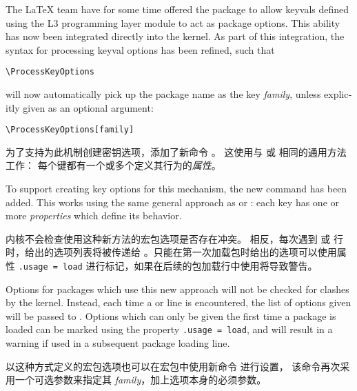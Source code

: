 \documentclass{ltnews}
\begin{document}
\begin{english}
The \LaTeX{} team have for some time offered the package  to
allow keyvals defined using the L3 programming layer module  to act
as package options. This ability has now been integrated directly into the
kernel. As part of this integration, the syntax for processing keyval options
has been refined, such that
\begin{verbatim}
\ProcessKeyOptions
\end{verbatim}
will now automatically pick up the package name as the key \emph{family},
unless explicitly given as an optional argument:
\begin{verbatim}
\ProcessKeyOptions[family]
\end{verbatim}
\end{english}

为了支持为此机制创建密钥选项，添加了新命令 。
这使用与  或  相同的通用方法工作：
每个键都有一个或多个定义其行为的\emph{属性}。

\begin{english}
To support creating key options for this mechanism, the new command
 has been added. This works using the same general
approach as  or : each key has one or more
\emph{properties} which define its behavior.
\end{english}

内核不会检查使用这种新方法的宏包选项是否存在冲突。
相反，每次遇到  或  行时，给出的选项列表将被传递给
。只能在第一次加载包时给出的选项可以使用属性 \texttt{.usage = load}
进行标记，如果在后续的包加载行中使用将导致警告。

\begin{english}
Options for packages which use this new approach will not be checked for
clashes by the kernel. Instead, each time a  or
 line is encountered, the list of options given will be
passed to . Options which can only be given
the first time a package is loaded can be marked using the property
\texttt{.usage = load}, and will result in a warning if used in a subsequent
package loading line.
\end{english}

以这种方式定义的宏包选项也可以在宏包中使用新命令  进行设置，
该命令再次采用一个可选参数来指定其 \emph{family}，加上选项本身的必须参数。
\end{document}

